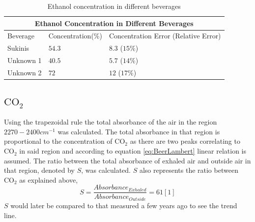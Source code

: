 \documentclass[reprint,amsmath,amssymb,aps, prl]{revtex4-2}
\begin{document}
\begin{table}[h]
\begin{tabular}{ |p{2.8cm}|p{2.8cm}|p{2.8cm}|  }
 \hline
 \multicolumn{3}{|c|}{Ethanol Concentration in Different Beverages} \\
 \hline
 Beverage& Concentration(\%) &Concentration Error (Relative Error) \\ \hline
 Sukinis    &$54.3$   &$8.3$ ($15\%$) \\
 Unknown 1  &$40.5$   &$5.7$ ($14\%$) \\
 Unknown 2  &$72$     & $12$ ($17\%$) \\ \hline
\end{tabular}
\caption{Ethanol concentration in different beverages}
\label{beverages table}
\end{table}

\subsection{$\text{CO}_{2}$}
Using the trapezoidal rule
 the total absorbance of the air in the region $2270-2400cm^{-1}$ was calculated.
  The total absorbance in that region is proportional to the concentration of $\text{CO}_{2}$ as there are two peaks correlating to $\text{CO}_{2}$ in said region \cite{NISTwebook} and according to equation \ref{eq:BeerLambert} linear relation is assumed.
 The ratio between the total absorbance of exhaled air and outside air in that region, denoted by $S$, was calculated. $S$  also represents the ratio between $\text{CO}_{2}$ as explained above,
\begin{equation}
\label{eq:CO2ratio}
S=\frac{Absorbance_{Exhaled}}{Absorbance_{Outside}}=61 [1] %
\end{equation}
$S$
would later be
compared to that measured a few years ago to see the trend line.  
\end{document}
